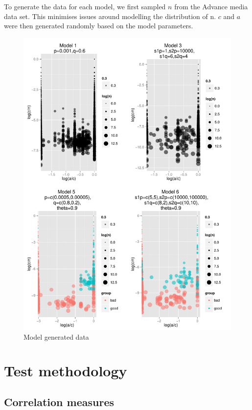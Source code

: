 \documentclass[11pt,a4,singlespacing,titlepagenumber=on]{scrreprt}
\numberwithin{equation}{chapter} %
\theoremstyle{remark}
\begin{document}
To generate the data for each model, we first sampled $n$ from the Advance media data set. This minimises issues around modelling the distribution of n. $c$ and $a$ were then generated randomly based on the model parameters.


\begin{figure}[p]
    	\centering
	\includegraphics[scale=0.7]{SynthData}
    	\caption{Model generated data}
\end{figure}




\section{Test methodology} 

\subsection{ Correlation measures}
\end{document}
